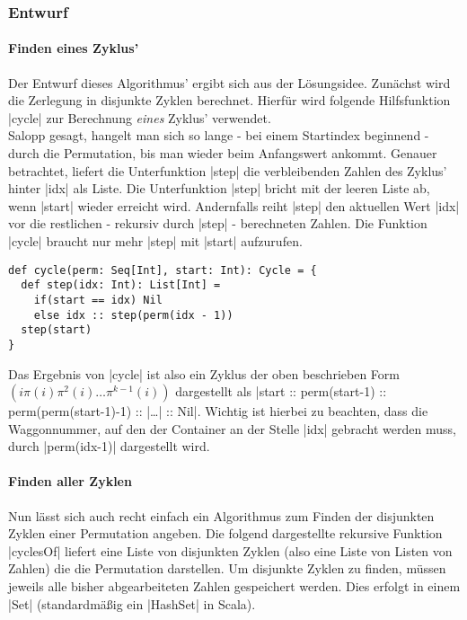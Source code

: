\subsubsection{Entwurf}
\label{slow_cycler_entwurf}
\paragraph{Finden eines Zyklus'}
Der Entwurf dieses Algorithmus' ergibt sich aus der Lösungsidee. Zunächst wird die Zerlegung in disjunkte Zyklen berechnet.
Hierfür wird folgende Hilfsfunktion |cycle| zur Berechnung \emph{eines} Zyklus' verwendet.\\
Salopp gesagt, hangelt man sich so lange - bei einem Startindex beginnend - durch die Permutation, bis man wieder beim Anfangswert ankommt.
Genauer betrachtet, liefert die Unterfunktion |step| die verbleibenden Zahlen des Zyklus' hinter |idx| als Liste.
Die Unterfunktion |step| bricht mit der leeren Liste ab, wenn |start| wieder erreicht wird.
Andernfalls reiht |step| den aktuellen Wert |idx| vor die restlichen - rekursiv durch |step| - berechneten Zahlen.
Die Funktion |cycle| braucht nur mehr |step| mit |start| aufzurufen.
\lstset{basicstyle=\ttfamily}
\begin{lstlisting}
def cycle(perm: Seq[Int], start: Int): Cycle = {
  def step(idx: Int): List[Int] =
    if(start == idx) Nil
    else idx :: step(perm(idx - 1))
  step(start)
}
\end{lstlisting}
Das Ergebnis von |cycle| ist also ein Zyklus der oben beschrieben Form $(i \pi(i) \pi^2(i) \dots \pi^{k-1}(i))$ dargestellt
als |start :: perm(start-1) :: perm(perm(start-1)-1) :: |\dots| :: Nil|.
Wichtig ist hierbei zu beachten, dass die Waggonnummer, auf den der Container an der Stelle |idx| gebracht werden muss,
 durch |perm(idx-1)| dargestellt wird.
\paragraph{Finden aller Zyklen}
Nun lässt sich auch recht einfach ein Algorithmus zum Finden der disjunkten Zyklen einer Permutation angeben.
Die folgend dargestellte rekursive Funktion |cyclesOf| liefert eine Liste von disjunkten Zyklen (also eine Liste von Listen von Zahlen)
die die Permutation darstellen. Um disjunkte Zyklen zu finden, müssen jeweils alle bisher abgearbeiteten Zahlen gespeichert werden.
Dies erfolgt in einem |Set| (standardmäßig ein |HashSet| in Scala).


